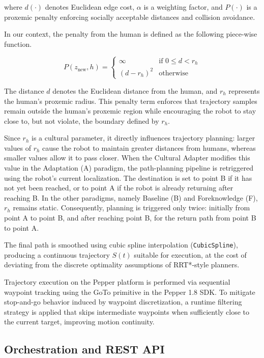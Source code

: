 where $d(\cdot)$ denotes Euclidean edge cost, $\alpha$ is a weighting factor, and $P(\cdot)$ is a proxemic penalty enforcing socially acceptable distances and collision avoidance.

In our context, the penalty from the human is defined as the following piece-wise function.

$$
P(z_{\text{new}}, h) = \begin{cases} 
\infty & \text{if } 0 \le d < r_h \\ 
(d - r_h)^2 & \text{otherwise}
\end{cases}
$$

The distance $d$ denotes the Euclidean distance from the human, and $r_h$ represents the human’s proxemic radius. This penalty term enforces that trajectory samples remain outside the human’s proxemic region while encouraging the robot to stay close to, but not violate, the boundary defined by $r_h$.

Since $r_h$ is a cultural parameter, it directly influences trajectory planning: larger values of $r_h$ cause the robot to maintain greater distances from humans, whereas smaller values allow it to pass closer.
When the Cultural Adapter modifies this value in the Adaptation (A) paradigm, the path-planning pipeline is retriggered using the robot’s current localization. The destination is set to point B if it has not yet been reached, or to point A if the robot is already returning after reaching B.
In the other paradigms, namely Baseline (B) and Foreknowledge (F), $r_h$ remains static. Consequently, planning is triggered only twice: initially from point A to point B, and after reaching point B, for the return path from point B to point A. %

The final path is smoothed using cubic spline interpolation (\texttt{CubicSpline}), producing a continuous trajectory $S(t)$ suitable for execution, at the cost of deviating from the discrete optimality assumptions of RRT*-style planners.

Trajectory execution on the Pepper platform is performed via sequential waypoint tracking using the GoTo primitive in the Pepper 1.8 SDK. To mitigate stop-and-go behavior induced by waypoint discretization, a runtime filtering strategy is applied that skips intermediate waypoints when sufficiently close to the current target, improving motion continuity.


\subsection{Orchestration and REST API}

